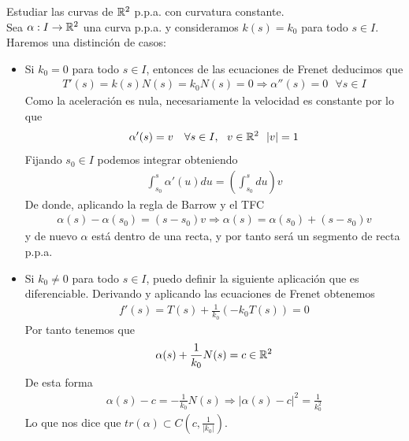 \begin{ejercicio}
    Estudiar las curvas de $\mathbb{R}^2$ p.p.a. con curvatura constante.\\

    Sea $\alpha:I\to \mathbb{R}^2$ una curva p.p.a. y consideramos $k(s)=k_0$ para todo $s\in I$. Haremos una distinción de casos:
    \begin{itemize}
        \item Si $k_0=0$ para todo $s\in I$, entonces de las ecuaciones de Frenet deducimos que 
        \begin{gather*}
            T'(s) = k(s)N(s) = k_0N(s)=0 \Rightarrow \alpha''(s)=0 \ \ \ \forall s \in I
        \end{gather*}
        Como la aceleración es nula, necesariamente la velocidad es constante por lo que 
        \begin{gather*}
            \alpha'(s) = v \ \ \ \forall s \in I,\ \ v\in \bb{R}^2\ \ |v|=1
        \end{gather*}
        Fijando $s_0\in I$ podemos integrar obteniendo
        \begin{gather*}
            \int_{s_0}^s \alpha'(u)du= \left(\int_{s_0}^sdu\right)v
        \end{gather*}
        De donde, aplicando la regla de Barrow y el TFC
        \begin{gather*}
            \alpha(s) - \alpha(s_0) = (s-s_0)v \Rightarrow \alpha(s)=\alpha(s_0) + (s-s_0)v
        \end{gather*}
        y de nuevo $\alpha$ está dentro de una recta, y por tanto será un segmento de recta p.p.a.

        \item Si $k_0\neq 0$ para todo $s\in I$, puedo definir la siguiente aplicación
        que es diferenciable. Derivando y aplicando las ecuaciones de Frenet obtenemos 
        \begin{gather*}
            f'(s) = T(s) + \frac{1}{k_0}(-k_0T(s)) = 0
        \end{gather*}
        Por tanto tenemos que 
        \begin{gather*}
            \alpha(s) + \frac{1}{k_0}N(s) = c\in \mathbb{R}^2
        \end{gather*}
        De esta forma 
        \begin{gather*}
            \alpha(s) - c = -\frac{1}{k_0}N(s) \Rightarrow |\alpha(s)-c|^2 = \frac{1}{k_0^2}
        \end{gather*}
        Lo que nos dice que $tr(\alpha)\subset C(c, \frac{1}{|k_0|})$.
    \end{itemize}
\end{ejercicio}

